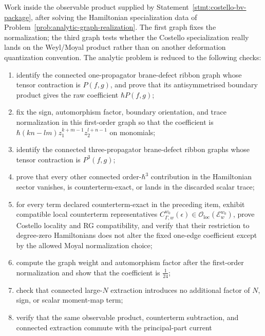 \documentclass[11pt]{memoir}
\begin{document}
\begin{prob}\label{prob:first-third-graph-normalizations}
  Work inside the observable product supplied by
  Statement~\ref{stmt:costello-bv-package}, after solving the Hamiltonian
  specialization data of Problem~\ref{prob:analytic-graph-realization}. The
  first graph fixes the normalization; the third graph tests whether the
  Costello specialization really lands on the Weyl/Moyal product rather than on
  another deformation quantization convention. The analytic problem is reduced
  to the following checks:
  \begin{enumerate}
    \item identify the connected one-propagator brane-defect ribbon graph whose
      tensor contraction is $P(f,g)$, and prove that its antisymmetrised
      boundary product gives the raw coefficient
      $\hbar P(f,g)$;
    \item fix the sign, automorphism factor, boundary orientation, and trace
      normalization in this first-order graph so that the coefficient is
      $\hbar(kn-lm)z_1^{k+m-1}z_2^{l+n-1}$ on monomials;
    \item identify the connected three-propagator brane-defect ribbon graphs
      whose tensor contraction is $P^3(f,g)$;
	    \item prove that every other connected order-$\hbar^3$ contribution in the
	      Hamiltonian sector vanishes, is counterterm-exact, or lands in the
	      discarded scalar trace;
	    \item for every term declared counterterm-exact in the preceding item,
	      exhibit compatible local counterterm representatives
	      \(C_{\Gamma,w}^{w_0}(\epsilon)\in
	      \mathcal O_{\mathrm{loc}}(\mathcal E_w^{w_0})\), prove Costello
	      locality and RG compatibility, and verify that their restriction to
	      degree-zero Hamiltonians does not alter the fixed one-edge coefficient
	      except by the allowed Moyal normalization choice;
	    \item compute the graph weight and automorphism factor after the
	      first-order normalization and show that the coefficient is
	      $\frac1{24}$;
	    \item check that connected large-$N$ extraction introduces no additional
	      factor of $N$, sign, or scalar moment-map term;
	    \item verify that the same observable product, counterterm subtraction,
	      and connected extraction commute with the principal-part current

\end{enumerate}
\end{prob}
\end{document}
